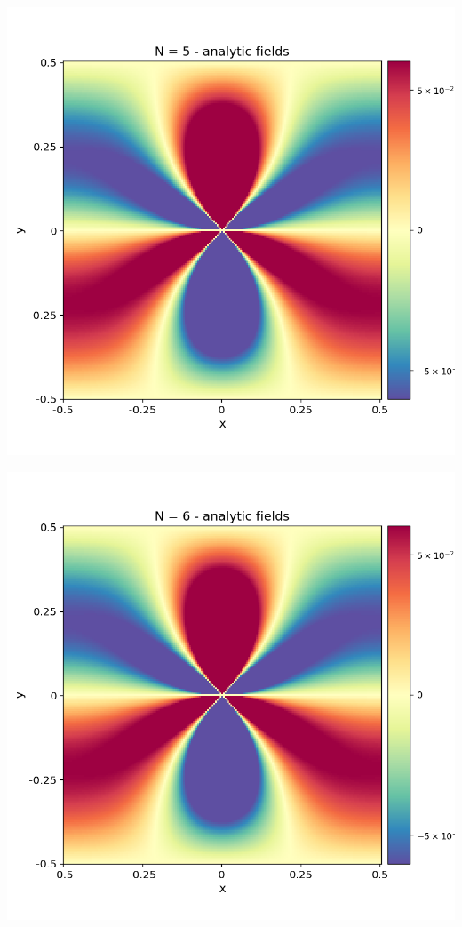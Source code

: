 \documentclass[12pt,a4paper]{article}
\theoremstyle{plain}
\begin{document}
\begin{multicols*}{2}
	\begin{minipage}{0.22\columnwidth}
		\centering
		\includegraphics[width=\columnwidth]{./stress_field_05.png}
	\end{minipage}
	\begin{minipage}{0.22\columnwidth}
		\centering
		\includegraphics[width=\columnwidth]{./stress_field_06.png}

\end{minipage}
\end{multicols*}
\end{document}
